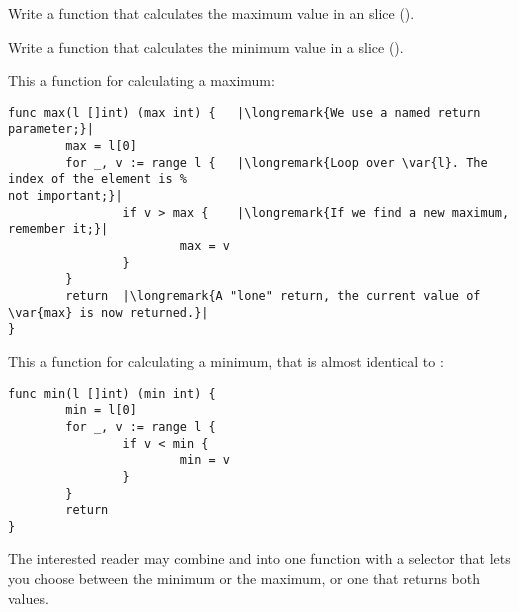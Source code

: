 \begin{Exercise}[title={Minimum and maximum},difficulty=3]
\label{ex:minmax}
\Question\label{ex:minmax q1} Write a function that calculates the
maximum value in an  slice ().

\Question\label{ex:minmax q2} Write a function that calculates the
minimum value in a  slice ().

\end{Exercise}

\begin{Answer}
\Question This a function for calculating a maximum:
\begin{lstlisting}
func max(l []int) (max int) {   |\longremark{We use a named return parameter;}|
        max = l[0]      
        for _, v := range l {   |\longremark{Loop over \var{l}. The index of the element is %
not important;}|
                if v > max {    |\longremark{If we find a new maximum, remember it;}|
                        max = v 
                }   
        }   
        return  |\longremark{A "lone" return, the current value of \var{max} is now returned.}|
}
\end{lstlisting}
\showremarks

\Question This a function for calculating a minimum, that is almost identical to :
\begin{lstlisting}
func min(l []int) (min int) {
        min = l[0]
        for _, v := range l { 
                if v < min {
                        min = v 
                }   
        }   
        return
}
\end{lstlisting}
The interested reader may combine  and  into one function with a selector
that lets you choose between the minimum or the maximum, or one that returns both values.
\end{Answer}
